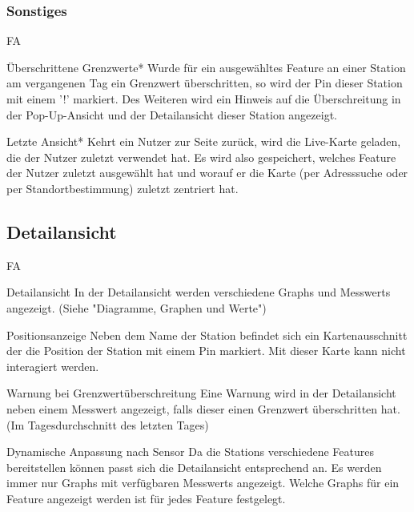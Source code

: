 \subsubsection*{Sonstiges}
\begin{Kriterien}{FA}
  \item[Überschrittene Grenzwerte*]
    Wurde für ein ausgewähltes \gls{Feature} an einer \gls{Station} am vergangenen Tag ein Grenzwert überschritten, so wird der 
    \gls{Pin} dieser \gls{Station} mit einem '!' markiert. Des Weiteren wird ein Hinweis auf die Überschreitung in der 
    Pop-Up-Ansicht und der \gls{Detailansicht} dieser \gls{Station} angezeigt.

  \item[Letzte Ansicht*]
    Kehrt ein Nutzer zur Seite zurück, wird die \gls{Live-Karte} geladen, die der Nutzer zuletzt verwendet hat. Es wird also 
    gespeichert, welches Feature der Nutzer zuletzt ausgewählt hat und worauf er die Karte (per Adresssuche oder per 
    Standortbestimmung) zuletzt zentriert hat.
\end{Kriterien}


\subsection{Detailansicht}

\begin{Kriterien}{FA}
  \item[Detailansicht]
    In der Detailansicht werden verschiedene \glspl{Graph} und \glspl{Messwert} angezeigt. 
    (Siehe "Diagramme, Graphen und Werte")

  \item[Positionsanzeige]
    Neben dem Name der \gls{Station} befindet sich ein Kartenausschnitt der die Position der \gls{Station} mit einem \gls{Pin} 
    markiert. Mit dieser Karte kann nicht interagiert werden.

  \item[Warnung bei Grenzwertüberschreitung]
     Eine Warnung wird in der Detailansicht neben einem \gls{Messwert} angezeigt, falls dieser einen Grenzwert überschritten 
     hat. (Im Tagesdurchschnitt des letzten Tages)

  \item[Dynamische Anpassung nach Sensor]
    Da die \glspl{Station} verschiedene \glspl{Feature} bereitstellen können passt sich die Detailansicht entsprechend an. Es 
    werden immer nur \glspl{Graph} mit verfügbaren \glspl{Messwert} angezeigt. Welche \glspl{Graph} für ein \gls{Feature} 
    angezeigt werden ist für jedes \gls{Feature} festgelegt.
\end{Kriterien}


